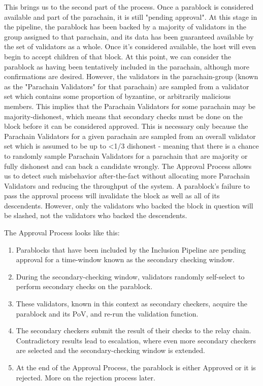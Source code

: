 This brings us to the second part of the process. Once a parablock is considered
available and part of the parachain, it is still "pending approval". At this
stage in the pipeline, the parablock has been backed by a majority of validators
in the group assigned to that parachain, and its data has been guaranteed
available by the set of validators as a whole. Once it's considered available,
the host will even begin to accept children of that block. At this point, we can
consider the parablock as having been tentatively included in the parachain,
although more confirmations are desired. However, the validators in the
parachain-group (known as the "Parachain Validators" for that parachain) are
sampled from a validator set which contains some proportion of byzantine, or
arbitrarily malicious members. This implies that the Parachain Validators for
some parachain may be majority-dishonest, which means that secondary checks must
be done on the block before it can be considered approved. This is necessary
only because the Parachain Validators for a given parachain are sampled from an
overall validator set which is assumed to be up to <1/3 dishonest - meaning that
there is a chance to randomly sample Parachain Validators for a parachain that
are majority or fully dishonest and can back a candidate wrongly. The Approval
Process allows us to detect such misbehavior after-the-fact without allocating
more Parachain Validators and reducing the throughput of the system. A
parablock's failure to pass the approval process will invalidate the block as
well as all of its descendents. However, only the validators who backed the
block in question will be slashed, not the validators who backed the
descendents.
\newline

The Approval Process looks like this:

\begin{enumerate}
    \item Parablocks that have been included by the Inclusion Pipeline are
    pending approval for a time-window known as the secondary checking window.
    \item During the secondary-checking window, validators randomly self-select
    to perform secondary checks on the parablock.
    \item These validators, known in this context as secondary checkers, acquire
    the parablock and its PoV, and re-run the validation function.
    \item The secondary checkers submit the result of their checks to the relay
    chain. Contradictory results lead to escalation, where even more secondary
    checkers are selected and the secondary-checking window is extended.
    \item At the end of the Approval Process, the parablock is either Approved
    or it is rejected. More on the rejection process later.
\end{enumerate}

